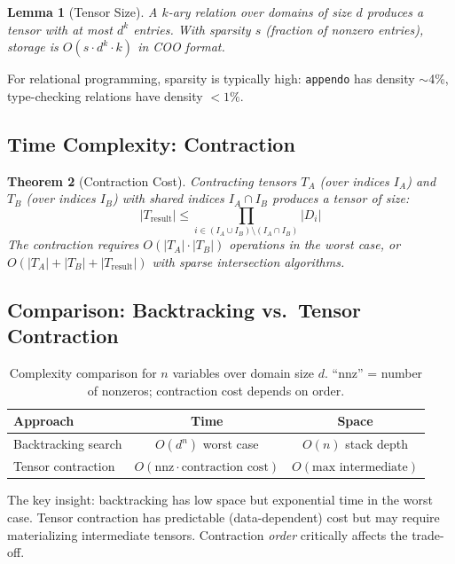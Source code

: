 \documentclass[11pt,a4paper]{article}
\newtheorem{theorem}{Theorem}
\newtheorem{lemma}[theorem]{Lemma}
\begin{document}
\begin{lemma}[Tensor Size]
A $k$-ary relation over domains of size $d$ produces a tensor with at most $d^k$ entries.
With sparsity $s$ (fraction of nonzero entries), storage is $O(s \cdot d^k \cdot k)$ in COO format.
\end{lemma}

For relational programming, sparsity is typically high: \texttt{appendo} has density $\sim$4\%,
type-checking relations have density $< 1\%$.

\subsection{Time Complexity: Contraction}

\begin{theorem}[Contraction Cost]
\label{thm:contraction_cost_chirho}
Contracting tensors $T_A$ (over indices $I_A$) and $T_B$ (over indices $I_B$)
with shared indices $I_A \cap I_B$ produces a tensor of size:
\[
|T_{\text{result}}| \leq \prod_{i \in (I_A \cup I_B) \setminus (I_A \cap I_B)} |D_i|
\]
The contraction requires $O(|T_A| \cdot |T_B|)$ operations in the worst case,
or $O(|T_A| + |T_B| + |T_{\text{result}}|)$ with sparse intersection algorithms.
\end{theorem}

\subsection{Comparison: Backtracking vs.\ Tensor Contraction}

\begin{table}[ht]
\centering
\begin{tabular}{lcc}
\toprule
\textbf{Approach} & \textbf{Time} & \textbf{Space} \\
\midrule
Backtracking search & $O(d^n)$ worst case & $O(n)$ stack depth \\
Tensor contraction & $O(\text{nnz} \cdot \text{contraction cost})$ & $O(\text{max intermediate})$ \\
\bottomrule
\end{tabular}
\caption{Complexity comparison for $n$ variables over domain size $d$.
  ``nnz'' = number of nonzeros; contraction cost depends on order.}
\label{tab:complexity_chirho}
\end{table}

The key insight: backtracking has low space but exponential time in the worst case.
Tensor contraction has predictable (data-dependent) cost but may require materializing
intermediate tensors. Contraction \emph{order} critically affects the trade-off.
\end{document}
